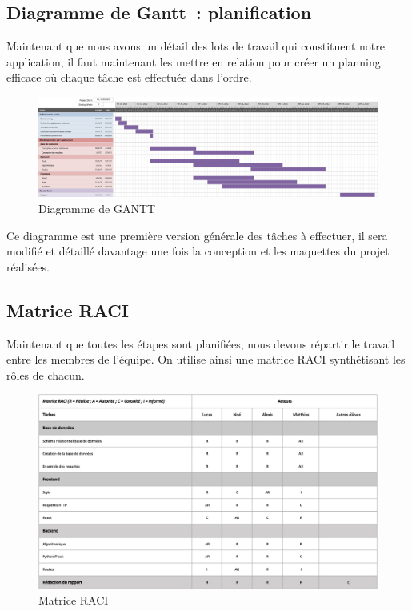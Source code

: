 \documentclass[french,a4paper]{article}
\begin{document}
\subsection{Diagramme de Gantt~: planification}
Maintenant que nous avons un détail des lots de travail qui constituent notre application, il faut maintenant les mettre en relation pour créer un planning efficace où chaque tâche est effectuée dans l’ordre.
\begin{figure}[H]
    \centering
    \includegraphics[width=1\textwidth]{img/gantt.png}
    \caption{Diagramme de GANTT}
\end{figure}
Ce diagramme est une première version générale des tâches à effectuer, il sera modifié et détaillé davantage une fois la conception et les maquettes du projet réalisées.

\subsection{Matrice RACI}
Maintenant que toutes les étapes sont planifiées, nous devons répartir le travail entre les membres de l’équipe. On utilise ainsi une matrice RACI synthétisant les rôles de chacun.

\begin{figure}[H]
    \centering
    \includegraphics[width=1\textwidth]{img/RACI.png}
    \caption{Matrice RACI}
\end{figure}
\end{document}
